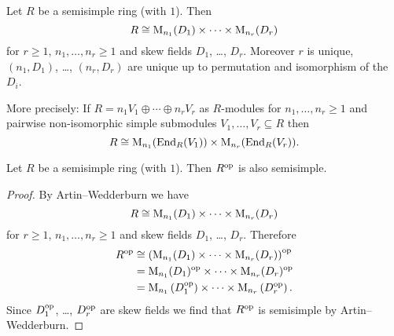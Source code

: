 \begin{thrm}
 Let $R$ be a semisimple ring (with $1$). Then
 \[
  R \cong \operatorname{M}_{n_1}(D_1) \times \dotsm \times \operatorname{M}_{n_r}(D_r)
 \]
 for $r \geq 1$, $n_1, \dotsc, n_r \geq 1$ and skew fields $D_1$, \dots, $D_r$. Moreover $r$ is unique, $(n_1,D_1)$, \dots, $(n_r,D_r)$ are unique up to permutation and isomorphism of the $D_i$.
 
 More precisely: If $R = n_1 V_1 \oplus \dotsb \oplus n_r V_r$ as $R$-modules for $n_1, \dotsc, n_r \geq 1$ and pairwise non-isomorphic simple submodules $V_1, \dotsc, V_r \subseteq R$ then
 \[
  R \cong \operatorname{M}_{n_1}(\operatorname{End}_R(V_1)) \times \operatorname{M}_{n_r}(\operatorname{End}_R(V_r)).
 \]
\end{thrm}


\begin{cor}
 Let $R$ be a semisimple ring (with $1$). Then $R^{\mathrm{op}}$ is also semisimple.
\end{cor}
\begin{proof}
 By Artin--Wedderburn we have
 \[
  R \cong \operatorname{M}_{n_1}(D_1) \times \dotsm \times \operatorname{M}_{n_r}(D_r)
 \]
 for $r \geq 1$, $n_1, \dotsc, n_r \geq 1$ and skew fields $D_1$, \dots, $D_r$. Therefore
 \begin{align*}
  R^{\mathrm{op}}
  &\cong \left( \operatorname{M}_{n_1}(D_1) \times \dotsm \times \operatorname{M}_{n_r}(D_r) \right)^{\mathrm{op}} \\
  &= \operatorname{M}_{n_1}(D_1)^{\mathrm{op}} \times \dotsm \times \operatorname{M}_{n_r}(D_r)^{\mathrm{op}} \\
  &= \operatorname{M}_{n_1}\left(D_1^{\mathrm{op}}\right) \times \dotsm \times \operatorname{M}_{n_r}\left(D_r^{\mathrm{op}}\right).
 \end{align*}
 Since $D_1^{\mathrm{op}}$, \dots, $D_r^{\mathrm{op}}$ are skew fields we find that $R^{\mathrm{op}}$ is semisimple by Artin--Wedderburn.
\end{proof}


